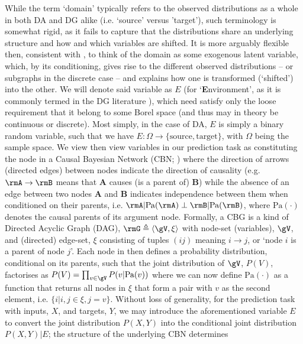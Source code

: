 While the term `domain' typically refers to the observed distributions as a whole in both DA and DG
alike (i.e. `source' versus 'target'), such terminology is somewhat rigid, as it fails to capture
that the distributions share an underlying structure and how and which variables are shifted.
%
It is more arguably flexible then, consistent with \citep{mooij2020joint}, to think of the domain
as some exogenous latent variable, which, by its conditioning, gives rise to the different observed
distributions -- or subgraphs in the discrete case -- and explains how one is transformed
(`shifted') into the other.
%
We will denote said variable as \(E\) (for `\textbf{E}nvironment', as it is commonly termed in the
DG literature \citep{arjovskyinvariant}), which need satisfy only the loose requirement that it
belong to some Borel space (and thus may in theory be continuous or discrete).
%
Most simply, in the case of DA, \(E\) is simply a binary random variable, such that we have \(E:
\Omega \to \{ \text{source}, \text{target} \}\), with \( \Omega \) being the sample space.
%
We view then view variables in our prediction task as constituting the node \gV \) in a Causal
Bayesian Network (CBN; \cite{pearl1995bayesian}) where the direction of arrows (directed edges)
between nodes indicate the direction of causality (e.g. \(\rmA \to \rmB \) means that \textbf{A}
causes (is a parent of) \textbf{B}) while the absence of an edge between two nodes \textbf{A} and
\textbf{B} indicates independence between them when conditioned on their parents, i.e. \( \rmA |
\text{Pa}(\rmA) \perp \rmB | \text{Pa}(\rmB) \), where \( \text{Pa}(\cdot) \) denotes the causal
parents of its argument node.
%
Formally, a CBG is a kind of Directed Acyclic Graph (DAG), \(\rmG \triangleq \langle \gV, \xi
\rangle \) with node-set (variables), \(\gV\), and (directed) edge-set, \(\xi\) consisting of
tuples \((ij)\) meaning \(i \to j \), or `node \(i\) is a parent of node \(j\)'.
%
Each node in \rmG then defines a probability distribution, conditional on its parents, such that
the joint distribution of \(\gV\), \(P(V)\), factorises as \( P(V) = \prod_{v \in \gV} P(v |
\text{Pa}(v)) \) where we can now define \(\text{Pa}(\cdot)\) as a function that returns all nodes
in \(\xi\) that form a pair with \(v\) as the second element, i.e. \( \{ i | i,j \in \xi, j = v \}
\).
%
Without loss of generality, for the prediction task with inputs, \(X\), and targets, \(Y\), we may
introduce the aforementioned variable \(E\) to convert the joint distribution \(P(X, Y)\) into the
conditional joint distribution \( P(X, Y) | E \); the structure of the underlying CBN determines
